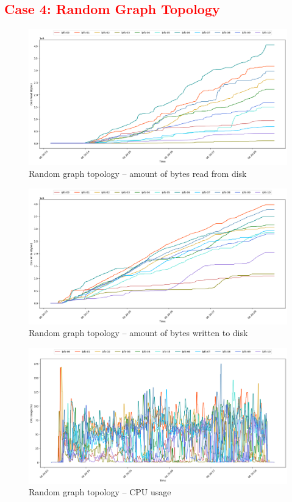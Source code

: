 \subsection{\textcolor{red}{Case 4: Random Graph Topology}}

\begin{figure}[H]
\includegraphics[width=\linewidth]{figures/graph-random/blk_read.png}
\caption{Random graph topology -- amount of bytes read from disk}
\end{figure}
\begin{figure}[H]
\includegraphics[width=\linewidth]{figures/graph-random/blk_write.png}
\caption{Random graph topology -- amount of bytes written to disk}
\end{figure}
\begin{figure}[H]
\includegraphics[width=\linewidth]{figures/graph-random/cpu_usage.png}
\caption{Random graph topology -- CPU usage}
\end{figure}
